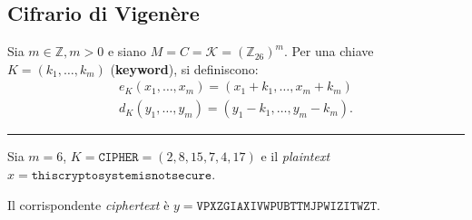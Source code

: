     \subsection{Cifrario di Vigenère}
        Sia $m \in \mathbb{Z}, m>0$ e siano $M = C = \mathcal{K} = (\mathbb{Z}_{26})^{m}$. Per una chiave $K = (k_{1},\dots,k_{m})$ (\textbf{keyword}), si definiscono:
        \begin{align*}
            e_K(x_1,\dots,x_m) = (x_1+k_1,\dots, x_m + k_m)\\    
            d_K(y_1,\dots,y_m) = (y_1-k_1,\dots,y_m-k_m).
        \end{align*}
            
    \vspace{1em}
    \hrule
\begin{example}
    Sia $m=6$, $K=\texttt{CIPHER}=(2,8,15,7,4,17)$ e il
    \textit{plaintext} $x=\texttt{thiscryptosystemisnotsecure}$.

    \begin{center}
    \end{center}

    \noindent Il corrispondente \textit{ciphertext} è $y = \texttt{VPXZGIAXIVWPUBTTMJPWIZITWZT}$.
\end{example}

    
